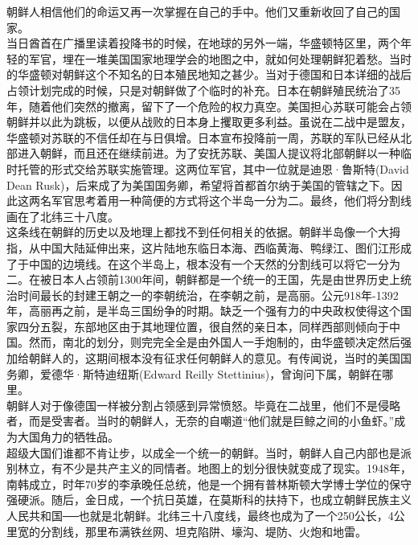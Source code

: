 \begin{multicols}{\theparacolNo}
朝鲜人相信他们的命运又再一次掌握在自己的手中。他们又重新收回了自己的国家。\\

当日酋首在广播里读着投降书的时候，在地球的另外一端，华盛顿特区里，两个年轻的军官，埋在一堆美国国家地理学会的地图之中，就如何处理朝鲜犯着愁。当时的华盛顿对朝鲜这个不知名的日本殖民地知之甚少。当对于德国和日本详细的战后占领计划完成的时候，只是对朝鲜做了个临时的补充。日本在朝鲜殖民统治了35年，随着他们突然的撤离，留下了一个危险的权力真空。美国担心苏联可能会占领朝鲜并以此为跳板，以便从战败的日本身上攫取更多利益。虽说在二战中是盟友，华盛顿对苏联的不信任却在与日俱增。日本宣布投降前一周，苏联的军队已经从北部进入朝鲜，而且还在继续前进。为了安抚苏联、美国人提议将北部朝鲜以一种临时托管的形式交给苏联实施管理。这两位军官，其中一位就是迪恩·鲁斯特(David Dean Rusk)，后来成了为美国国务卿，希望将首都首尔纳于美国的管辖之下。因此这两名军官思考着用一种简便的方式将这个半岛一分为二。最终，他们将分割线画在了北纬三十八度。\\

这条线在朝鲜的历史以及地理上都找不到任何相关的依据。朝鲜半岛像一个大拇指，从中国大陆延伸出来，这片陆地东临日本海、西临黄海、鸭绿江、图们江形成了于中国的边境线。在这个半岛上，根本没有一个天然的分割线可以将它一分为二。在被日本人占领前1300年间，朝鲜都是一个统一的王国，先是由世界历史上统治时间最长的封建王朝之一的李朝统治，在李朝之前，是高丽。公元918年-1392年，高丽再之前，是半岛三国纷争的时期。缺乏一个强有力的中央政权使得这个国家四分五裂，东部地区由于其地理位置，很自然的亲日本，同样西部则倾向于中国。然而，南北的划分，则完完全全是由外国人一手炮制的，由华盛顿决定然后强加给朝鲜人的，这期间根本没有征求任何朝鲜人的意见。有传闻说，当时的美国国务卿，爱德华·斯特迪纽斯(Edward Reilly Stettinius)，曾询问下属，朝鲜在哪里。\\

朝鲜人对于像德国一样被分割占领感到异常愤怒。毕竟在二战里，他们不是侵略者，而是受害者。当时的朝鲜人，无奈的自嘲道“他们就是巨鲸之间的小鱼虾。”成为大国角力的牺牲品。\\

超级大国们谁都不肯让步，以成全一个统一的朝鲜。当时，朝鲜人自己内部也是派别林立，有不少是共产主义的同情者。地图上的划分很快就变成了现实。1948年，南韩成立，时年70岁的李承晚任总统，他是一个拥有普林斯顿大学博士学位的保守强硬派。随后，金日成，一个抗日英雄，在莫斯科的扶持下，也成立朝鲜民族主义人民共和国──也就是北朝鲜。北纬三十八度线，最终也成为了一个250公长，4公里宽的分割线，那里布满铁丝网、坦克陷阱、壕沟、堤防、火炮和地雷。\\


\end{multicols}

